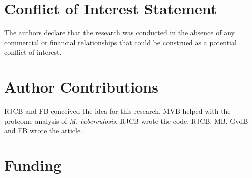 \documentclass[utf8]{frontiersSCNS} %
\begin{document}
%
%
%
%

\section*{Conflict of Interest Statement}


The authors declare that the research was conducted in the absence of any commercial or financial relationships that could be construed as a potential conflict of interest.

\section*{Author Contributions}


RJCB and FB conceived the idea for this research. 
MVB helped with the proteome analysis of \emph{M. tuberculosis}.
RJCB wrote the code.
RJCB, MB, GvdB and FB wrote the article.

\section*{Funding}
\end{document}
